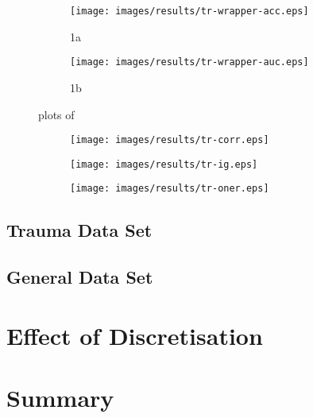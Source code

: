 \begin{figure}
\ContinuedFloat

\begin{subfigure}{.48\textwidth}
\texttt{[image: images/results/tr-wrapper-acc.eps]}
\caption{1a}
\label{}
\end{subfigure}%
\begin{subfigure}{.55\textwidth}
\texttt{[image: images/results/tr-wrapper-auc.eps]}
\caption{1b}
\label{}
\end{subfigure}
\caption{plots of}
\label{}
\end{figure}

\begin{figure}[htbp]
\begin{subfigure}{\textwidth}
\texttt{[image: images/results/tr-corr.eps]}
\caption{}
\label{}
\end{subfigure}
\caption{}
\label{}
\end{figure}

\begin{figure}[htbp]
\ContinuedFloat
\begin{subfigure}{\textwidth}
\texttt{[image: images/results/tr-ig.eps]}
\caption{}
\label{}
\end{subfigure}
\end{figure}

\begin{figure}[htbp]
\ContinuedFloat
\begin{subfigure}{\textwidth}
\texttt{[image: images/results/tr-oner.eps]}
\caption{}
\label{}
\end{subfigure}
\end{figure}

\subsection{Trauma Data Set}

\subsection{General Data Set}

\section{Effect of Discretisation}

\section{Summary}
